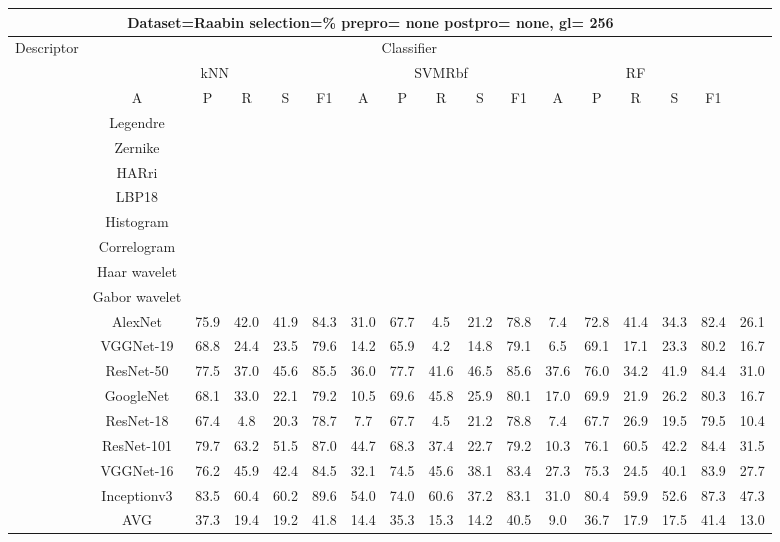 \documentclass[12pt,italian]{article}
\begin{document}
\begin{tiny}
 \pagebreak 
\begin{longtable}{lcccccccccccccccc}
\toprule
\multicolumn{16}{c}{Dataset=Raabin selection=\% prepro= none postpro= none, gl= 256} \\ 
\toprule
Descriptor & \multicolumn{15}{c}{Classifier} \\ 
& \multicolumn{5}{c}{kNN} & \multicolumn{5}{c}{SVMRbf} & \multicolumn{5}{c}{RF} \\ 
& A & P & R & S & F1 & A & P & R & S & F1 & A & P & R & S & F1 \\ 
\midrule
& Legendre \\ 
& Zernike \\ 
& HARri \\ 
& LBP18 \\ 
& Histogram \\ 
& Correlogram \\ 
& Haar wavelet \\ 
& Gabor wavelet \\ 
& AlexNet & 75.9 & 42.0 & 41.9 & 84.3 & 31.0 & 67.7 &  4.5 & 21.2 & 78.8 &  7.4 & 72.8 & 41.4 & 34.3 & 82.4 & 26.1 \\ 
& VGGNet-19 & 68.8 & 24.4 & 23.5 & 79.6 & 14.2 & 65.9 &  4.2 & 14.8 & 79.1 &  6.5 & 69.1 & 17.1 & 23.3 & 80.2 & 16.7 \\ 
& ResNet-50 & 77.5 & 37.0 & 45.6 & 85.5 & 36.0 & 77.7 & 41.6 & 46.5 & 85.6 & 37.6 & 76.0 & 34.2 & 41.9 & 84.4 & 31.0 \\ 
& GoogleNet & 68.1 & 33.0 & 22.1 & 79.2 & 10.5 & 69.6 & 45.8 & 25.9 & 80.1 & 17.0 & 69.9 & 21.9 & 26.2 & 80.3 & 16.7 \\ 
& ResNet-18 & 67.4 &  4.8 & 20.3 & 78.7 &  7.7 & 67.7 &  4.5 & 21.2 & 78.8 &  7.4 & 67.7 & 26.9 & 19.5 & 79.5 & 10.4 \\ 
& ResNet-101 & 79.7 & 63.2 & 51.5 & 87.0 & 44.7 & 68.3 & 37.4 & 22.7 & 79.2 & 10.3 & 76.1 & 60.5 & 42.2 & 84.4 & 31.5 \\ 
& VGGNet-16 & 76.2 & 45.9 & 42.4 & 84.5 & 32.1 & 74.5 & 45.6 & 38.1 & 83.4 & 27.3 & 75.3 & 24.5 & 40.1 & 83.9 & 27.7 \\ 
& Inceptionv3 & 83.5 & 60.4 & 60.2 & 89.6 & 54.0 & 74.0 & 60.6 & 37.2 & 83.1 & 31.0 & 80.4 & 59.9 & 52.6 & 87.3 & 47.3 \\ 
\hline
& AVG & 37.3 & 19.4 & 19.2 & 41.8 & 14.4 & 35.3 & 15.3 & 14.2 & 40.5 &  9.0 & 36.7 & 17.9 & 17.5 & 41.4 & 13.0 \\ 
\hline
\bottomrule
\end{longtable} 

 \pagebreak 
\end{tiny} 
 
\end{document}

